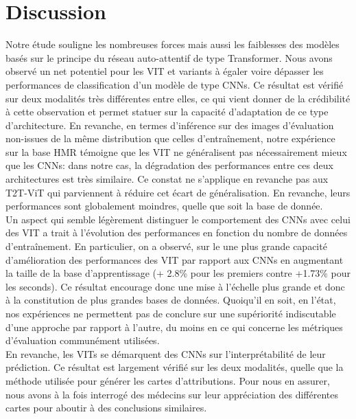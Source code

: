 \section{Discussion}
\label{sec:discussionFocusedAttention}
Notre étude souligne les nombreuses forces mais aussi les faiblesses des modèles basés sur le principe du réseau auto-attentif de type Transformer. Nous avons observé un net potentiel pour les \ac{VIT} et variants à égaler voire dépasser les performances de classification d'un modèle de type CNNs. Ce résultat est vérifié sur deux modalités très différentes entre elles, ce qui vient donner de la crédibilité à cette observation et permet statuer sur la capacité d'adaptation de ce type d'architecture. En revanche, en termes d'inférence sur des images d'évaluation non-issues de la même distribution que celles d'entraînement, notre expérience sur la base \ac{HMR} témoigne que les \ac{VIT} ne généralisent pas nécessairement mieux que les CNNs: dans notre cas, la dégradation des performances entre ces deux architectures est très similaire. Ce constat ne s'applique en revanche pas aux T2T-ViT qui parviennent à réduire cet écart de généralisation. En revanche, leurs performances sont globalement moindres, quelle que soit la base de donnée. \\
Un aspect qui semble légèrement distinguer le comportement des CNNs avec celui des \ac{VIT} a trait à l'évolution des performances en fonction du nombre de données d'entraînement. En particulier, on a observé, sur le \fundus{} une plus grande capacité d'amélioration des performances des \ac{VIT} par rapport aux CNNs en augmentant la taille de la base d'apprentissage (+ 2.8\% pour les premiers contre +1.73\% pour les seconds). Ce résultat encourage donc une mise à l'échelle plus grande et donc à la constitution de plus grandes bases de données. Quoiqu'il en soit, en l'état, nos expériences ne permettent pas de conclure sur une supériorité indiscutable d'une approche par rapport à l'autre, du moins en ce qui concerne les métriques d'évaluation communément utilisées.
\\
En revanche, les \ac{VIT}s se démarquent des \ac{CNN}s sur l'interprétabilité de leur prédiction. Ce résultat est largement vérifié sur les deux modalités, quelle que la méthode utilisée pour générer les cartes d'attributions. Pour nous en assurer, nous avons à la fois interrogé des médecins sur leur appréciation des différentes cartes pour aboutir à des conclusions similaires. 
